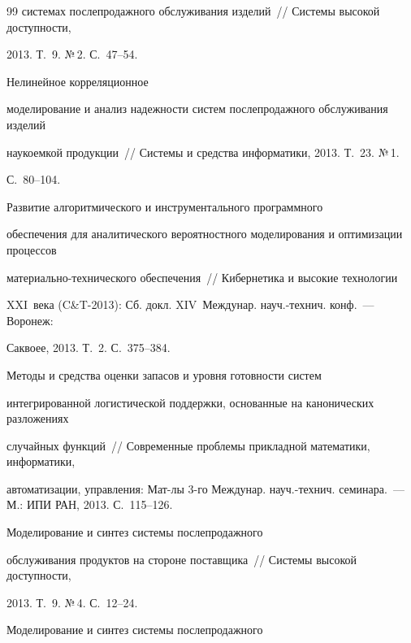 {{\begin{thebibliography}{99}
системах послепродажного обслуживания изделий~/\!\!/ Сис\-те\-мы высокой доступности,

2013. Т.~9. №\,2. С.~47--54.


 Нелинейное корреляционное

моделирование и анализ надежности сис\-тем послепродажного обслуживания изделий

наукоемкой продукции~/\!\!/ Сис\-те\-мы и средства информатики, 2013. Т.~23. №\,1.

С.~80--104.


 Развитие алгоритмического и инструментального программного

обеспечения для аналитического вероятностного моделирования и оптимизации процессов

ма\-те\-ри\-аль\-но-тех\-ни\-че\-ско\-го обеспечения~/\!\!/ Кибернетика и высокие технологии

XXI~века (C\&T-2013): Сб. докл. XIV~Междунар. науч.-технич. конф.~--- Воронеж:

Саквоее, 2013. Т.~2. С.~375--384.


 Методы и средства оценки запасов и уровня готовности сис\-тем

интегрированной логистической поддержки, основанные на канонических разложениях

случайных функций~/\!\!/ Современные проблемы прикладной математики, информатики,

автоматизации, управления: Мат-лы 3-го Междунар. науч.-технич. семинара.~---  М.: ИПИ РАН, 2013. С.~115--126.


 Моделирование и синтез системы послепродажного

обслуживания продуктов на стороне по\-став\-щи\-ка~/\!\!/ Сис\-те\-мы высокой доступности,

2013. Т.~9. №\,4. С.~12--24.


 Моделирование и синтез сис\-те\-мы послепродажного


\end{thebibliography}}}
